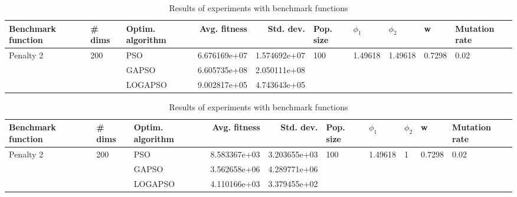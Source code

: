 \documentclass{article}
\begin{document}
\begin{table}
\centering
\caption{Results of experiments with benchmark functions}
\begin{tabular}{lllrrlllll}
\toprule
        Benchmark function &              \# dims & Optim. algorithm &  Avg. fitness &    Std. dev. &            Pop. size &               $\phi_{1}$ &               $\phi_{2}$ &                       w &         Mutation rate \\
\midrule
\multirow{3}{*}{Penalty 2} & \multirow{3}{*}{200} &              PSO &  6.676169e+07 & 1.574692e+07 & \multirow{3}{*}{100} & \multirow{3}{*}{1.49618} & \multirow{3}{*}{1.49618} & \multirow{3}{*}{0.7298} & \multirow{3}{*}{0.02} \\
                           &                      &            GAPSO &  6.605735e+08 & 2.050111e+08 &                      &                          &                          &                         &                       \\
                           &                      &          LOGAPSO &  9.002817e+05 & 4.743643e+05 &                      &                          &                          &                         &                       \\
\bottomrule
\end{tabular}
\end{table}
\begin{table}
\centering
\caption{Results of experiments with benchmark functions}
\begin{tabular}{lllrrlllll}
\toprule
        Benchmark function &              \# dims & Optim. algorithm &  Avg. fitness &    Std. dev. &            Pop. size &               $\phi_{1}$ &         $\phi_{2}$ &                       w &         Mutation rate \\
\midrule
\multirow{3}{*}{Penalty 2} & \multirow{3}{*}{200} &              PSO &  8.583367e+03 & 3.203655e+03 & \multirow{3}{*}{100} & \multirow{3}{*}{1.49618} & \multirow{3}{*}{1} & \multirow{3}{*}{0.7298} & \multirow{3}{*}{0.02} \\
                           &                      &            GAPSO &  3.562658e+06 & 4.289771e+06 &                      &                          &                    &                         &                       \\
                           &                      &          LOGAPSO &  4.110166e+03 & 3.379455e+02 &                      &                          &                    &                         &                       \\
\bottomrule
\end{tabular}
\end{table}
\end{document}
